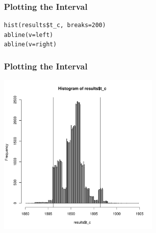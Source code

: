 \documentclass{beamer}
\begin{document}
\begin{frame}[fragile]
\frametitle{Plotting the Interval}
\begin{verbatim}
hist(results$t_c, breaks=200)
abline(v=left)
abline(v=right)
\end{verbatim}

\end{frame}

\begin{frame}[fragile]
\frametitle{Plotting the Interval}
\centering
\includegraphics[width=0.6\textwidth]{images/coal_interval.pdf}

\end{frame}
\end{document}
